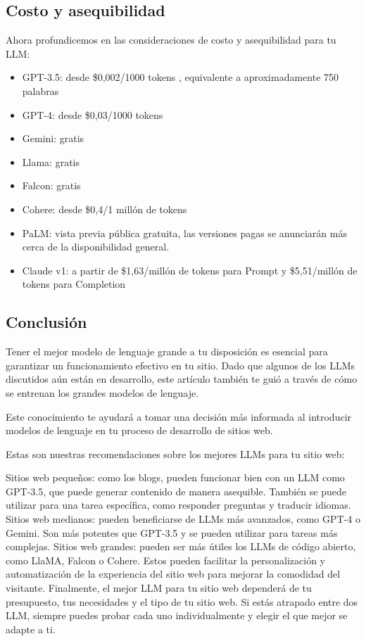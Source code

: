 \documentclass[a4paper12pt]{article}
\providecommand{\tightlist}{%
      \setlength{\itemsep}{0pt}\setlength{\parskip}{0pt}}
\begin{document}
    \hypertarget{costo-y-asequibilidad}{%
\subsection{Costo y asequibilidad}\label{costo-y-asequibilidad}}

Ahora profundicemos en las consideraciones de costo y asequibilidad para
tu LLM:

\begin{itemize}
\tightlist
\item
  GPT-3.5: desde \$0,002/1000 tokens , equivalente a aproximadamente 750
  palabras
\item
  GPT-4: desde \$0,03/1000 tokens
\item
  Gemini: gratis
\item
  Llama: gratis
\item
  Falcon: gratis
\item
  Cohere: desde \$0,4/1 millón de tokens
\item
  PaLM: vista previa pública gratuita, las versiones pagas se anunciarán
  más cerca de la disponibilidad general.
\item
  Claude v1: a partir de \$1,63/millón de tokens para Prompt y
  \$5,51/millón de tokens para Completion
\end{itemize}

\hypertarget{conclusiuxf3n}{%
\subsection{Conclusión}\label{conclusiuxf3n}}

Tener el mejor modelo de lenguaje grande a tu disposición es esencial
para garantizar un funcionamiento efectivo en tu sitio. Dado que algunos
de los LLMs discutidos aún están en desarrollo, este artículo también te
guió a través de cómo se entrenan los grandes modelos de lenguaje.

Este conocimiento te ayudará a tomar una decisión más informada al
introducir modelos de lenguaje en tu proceso de desarrollo de sitios
web.

Estas son nuestras recomendaciones sobre los mejores LLMs para tu sitio
web:

Sitios web pequeños: como los blogs, pueden funcionar bien con un LLM
como GPT-3.5, que puede generar contenido de manera asequible. También
se puede utilizar para una tarea específica, como responder preguntas y
traducir idiomas. Sitios web medianos: pueden beneficiarse de LLMs más
avanzados, como GPT-4 o Gemini. Son más potentes que GPT-3.5 y se pueden
utilizar para tareas más complejas. Sitios web grandes: pueden ser más
útiles los LLMs de código abierto, como LlaMA, Falcon o Cohere. Estos
pueden facilitar la personalización y automatización de la experiencia
del sitio web para mejorar la comodidad del visitante. Finalmente, el
mejor LLM para tu sitio web dependerá de tu presupuesto, tus necesidades
y el tipo de tu sitio web. Si estás atrapado entre dos LLM, siempre
puedes probar cada uno individualmente y elegir el que mejor se adapte a
ti.
\end{document}
